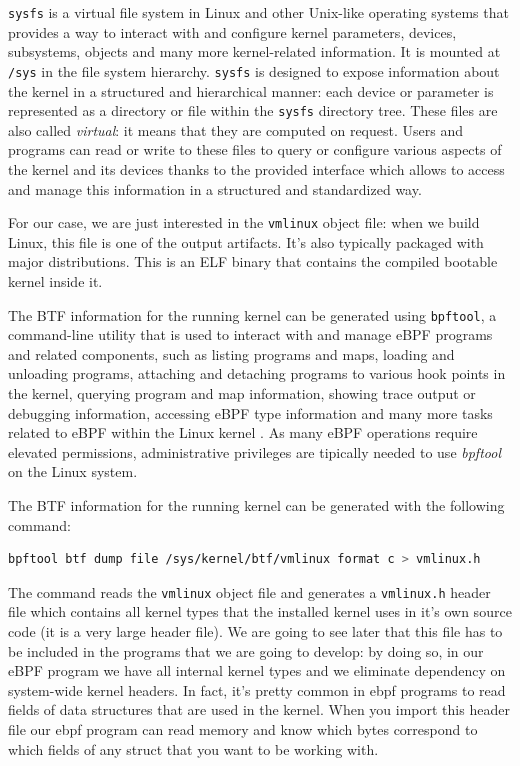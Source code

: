 \verb|sysfs| is a virtual file system in Linux and other Unix-like operating systems that provides a way to interact with and configure kernel parameters, devices, subsystems, objects and many more kernel-related information. 
It is mounted at \verb|/sys| in the file system hierarchy.
\verb|sysfs| is designed to expose information about the kernel in a structured and hierarchical manner: each device or parameter is represented as a directory or file within the \verb|sysfs| directory tree. 
These files are also called \textit{virtual}: it means that they are computed on request.
Users and programs can read or write to these files to query or configure various aspects of the kernel and its devices thanks to the provided interface which allows to access and manage this information in a structured and standardized way.

For our case, we are just interested in the \verb|vmlinux| object file: when we build Linux, this file is one of the output artifacts.
It's also typically packaged with major distributions. 
This is an ELF binary that contains the compiled bootable kernel inside it.

The BTF information for the running kernel can be generated using \verb|bpftool|, a command-line utility that is used to interact with and manage eBPF programs and related components, such as listing programs and maps, loading and unloading programs, attaching and detaching programs to various hook points in the kernel, querying program and map information, showing trace output or debugging information, accessing eBPF type information and many more tasks related to eBPF within the Linux kernel \cite{bpftoolGitHubRepo}.
As many eBPF operations require elevated permissions, administrative privileges are tipically needed to use \textit{bpftool} on the Linux system.

The BTF information for the running kernel can be generated with the following command:

\begin{lstlisting}[language=bash, caption={vmlinux.h generation command}]
	bpftool btf dump file /sys/kernel/btf/vmlinux format c > vmlinux.h
\end{lstlisting}

The command reads the \verb|vmlinux| object file and generates a \verb|vmlinux.h| header file which contains all kernel types that the installed kernel uses in it’s own source code (it is a very large header file). 
We are going to see later that this file has to be included in the programs that we are going to develop: by doing so, in our eBPF program we have all internal kernel types and we eliminate dependency on system-wide kernel headers.
In fact, it’s pretty common in ebpf programs to read fields of data structures that are used in the kernel. 
When you import this header file our ebpf program can read memory and know which bytes correspond to which fields of any struct that you want to be working with.


